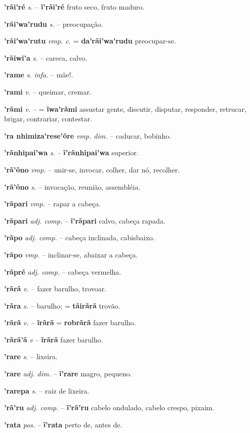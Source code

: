 \textbf{'rãi'ré} \textit{s.} -- \textbf{ĩ'rãi'ré} fruto seco, fruto maduro.

\textbf{'rãi'wa'rudu} \textit{s.} -- preocupação.

\textbf{'rãi'wa'rutu} \textit{vmp. c.} = \textbf{da'rãi'wa'rudu} preocupar-se.

\textbf{'rãiwi'a} \textit{s.} -- careca, calvo.

\textbf{'rame} \textit{s. infa.} -- mãe!.

\textbf{'rami} \textit{v.} -- queimar, cremar.

\textbf{'rãmi} \textit{v.} -- = \textbf{ĩwa'rãmi} assustar gente, discutir, disputar, responder, retrucar, brigar, contrariar, contestar.

\textbf{'ra nhimiza'rese'õre} \textit{vmp. dim.} -- caducar, bobinho.

\textbf{'rãnhipai'wa} \textit{s.} -- \textbf{ĩ'rãnhipai'wa} superior.

\textbf{'rã'õno} \textit{vmp.} -- unir-se, invocar, colher, dar nó, recolher.

\textbf{'rã'õno} \textit{s.} -- invocação, reunião, assembléia.

\textbf{'rãpari} \textit{vmp.} -- rapar a cabeça.

\textbf{'rãpari} \textit{adj. comp.} -- \textbf{ĩ'rãpari} calvo, cabeça rapada.

\textbf{'rãpo} \textit{adj. comp.} -- cabeça inclinada, cabisbaixo.

\textbf{'rãpo} \textit{vmp.} -- inclinar-se, abaixar a cabeça.

\textbf{'rãpré} \textit{adj. comp.} -- cabeça vermelha.

\textbf{'rãrã} \textit{v.} -- fazer barulho, trovoar.

\textbf{'rãra} \textit{s.} -- barulho; = \textbf{tãirãrã} trovão.

\textbf{'rãrã} \textit{v.} -- \textbf{ĩrãrã} = \textbf{robrãrã} fazer barulho.

\textbf{'rãrã'ã} \textit{v} -- \textbf{ĩrãrã} fazer barulho.

\textbf{'rare} \textit{s.} -- lixeira.

\textbf{'rare} \textit{adj. dim.} -- \textbf{ĩ'rare} magro, pequeno.

\textbf{'rarepa} \textit{s.} -- raiz de lixeira.

\textbf{'rã'ru} \textit{adj. comp.} -- \textbf{ĩ'rã'ru} cabelo ondulado, cabelo crespo, pixaim.

\textbf{'rata} \textit{pos.} -- \textbf{ĩ'rata} perto de, antes de.

